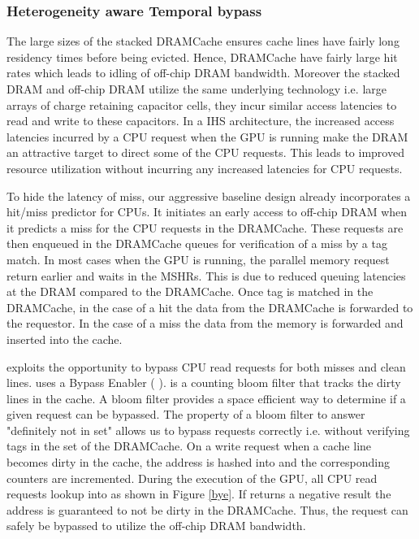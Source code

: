 \subsubsection{Heterogeneity aware Temporal bypass}
The large sizes of the stacked DRAMCache ensures cache lines have fairly long residency times before being evicted. Hence, DRAMCache have fairly large hit rates which leads to idling of off-chip DRAM bandwidth. Moreover the stacked DRAM and off-chip DRAM utilize the same underlying technology i.e. large arrays of charge retaining capacitor cells, they incur similar access latencies to read and write to these capacitors.
In a IHS architecture, the increased access latencies incurred by a CPU request when the GPU is running make the DRAM an attractive target to direct some of the CPU requests. This leads to improved resource utilization without incurring any increased latencies for CPU requests. 
\par To hide the latency of miss, our aggressive baseline design already incorporates a hit/miss predictor for CPUs. It initiates an early access to off-chip DRAM when it predicts a miss for the CPU requests in the DRAMCache. These requests are then enqueued in the DRAMCache queues for verification of a miss by a tag match. 
In most cases when the GPU is running, the parallel memory request return earlier and waits in the MSHRs. This is due to reduced queuing latencies at the DRAM compared to the DRAMCache. Once tag is matched in the DRAMCache, in the case of a hit the data from the DRAMCache is forwarded to the requestor. In the case of a miss the data from the memory is forwarded and inserted into the cache. 
\par \cachename exploits the opportunity to bypass CPU read requests for both misses and clean lines. \cachename uses a Bypass Enabler ( \bypassname). \bypassname is a counting bloom filter that tracks the dirty lines in the cache. A bloom filter provides a space efficient way to determine if a given request can be bypassed. The property of a bloom filter to answer "definitely not in set" allows us to bypass requests correctly i.e. without verifying tags in the set of the DRAMCache. 
On a write request when a cache line becomes dirty in the cache, the address is hashed into \bypassname and the corresponding counters are incremented. 
During the execution of the GPU, all CPU read requests lookup into \bypassname as shown in Figure \ref{bye}. If \bypassname returns a  negative result the address is guaranteed to not be dirty in the DRAMCache. Thus, the request can safely be bypassed to utilize the off-chip DRAM bandwidth. 
